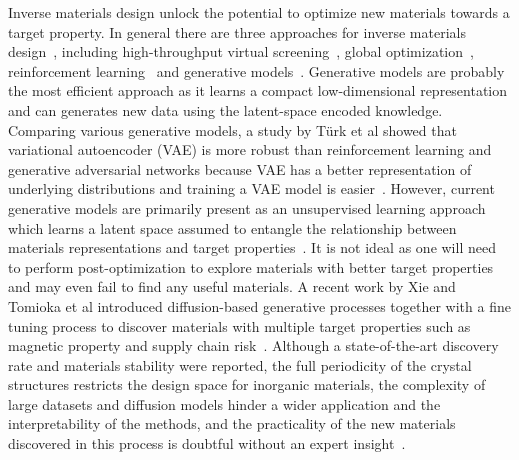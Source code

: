 \documentclass[a4paper]{article}
\begin{document}
Inverse materials design unlock the potential to optimize new materials towards a target property.
In general there are three approaches for inverse materials design~\cite{wang2022}, including high-throughput virtual screening~\cite{afzal2019}, global optimization~\cite{geng2019}, reinforcement learning~\cite{xian2024} and generative models~\cite{ma2019, popova2018}.
Generative models are probably the most efficient approach as it learns a compact low-dimensional representation and can generates new data using the latent-space encoded knowledge.
Comparing various generative models, a study by T\"{u}rk et al showed that variational autoencoder (VAE) is more robust than reinforcement learning and generative adversarial networks because VAE has a better representation of underlying distributions and training a VAE model is easier~\cite{turk2022}.
However, current generative models are primarily present as an unsupervised learning approach which learns a latent space assumed to entangle the relationship between materials representations and target properties~\cite{chen2020, wang2022, rao2022}.
It is not ideal as one will need to perform post-optimization to explore materials with better target properties and may even fail to find any useful materials.
A recent work by Xie and Tomioka et al introduced diffusion-based generative processes together with a fine tuning process to discover materials with multiple target properties such as magnetic property and supply chain risk~\cite{zeni2024}.
Although a state-of-the-art discovery rate and materials stability were reported, the full periodicity of the crystal structures restricts the design space for inorganic materials, the complexity of large datasets and diffusion models hinder a wider application and the interpretability of the methods, and the practicality of the new materials discovered in this process is doubtful without an expert insight~\cite{cheetham2024}.
\end{document}
